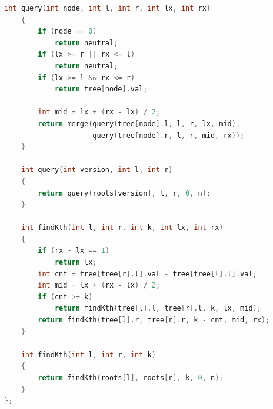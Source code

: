 \documentclass[10pt,landscape,a4paper,twocolumn]{article}
\begin{document}
\begin{lstlisting}[language=C++]
    int query(int node, int l, int r, int lx, int rx)
    {
        if (node == 0)
            return neutral;
        if (lx >= r || rx <= l)
            return neutral;
        if (lx >= l && rx <= r)
            return tree[node].val;

        int mid = lx + (rx - lx) / 2;
        return merge(query(tree[node].l, l, r, lx, mid),
                     query(tree[node].r, l, r, mid, rx));
    }

    int query(int version, int l, int r)
    {
        return query(roots[version], l, r, 0, n);
    }

    int findKth(int l, int r, int k, int lx, int rx)
    {
        if (rx - lx == 1)
            return lx;
        int cnt = tree[tree[r].l].val - tree[tree[l].l].val;
        int mid = lx + (rx - lx) / 2;
        if (cnt >= k)
            return findKth(tree[l].l, tree[r].l, k, lx, mid);
        return findKth(tree[l].r, tree[r].r, k - cnt, mid, rx);
    }

    int findKth(int l, int r, int k)
    {
        return findKth(roots[l], roots[r], k, 0, n);
    }
};

\end{lstlisting}
\end{document}
